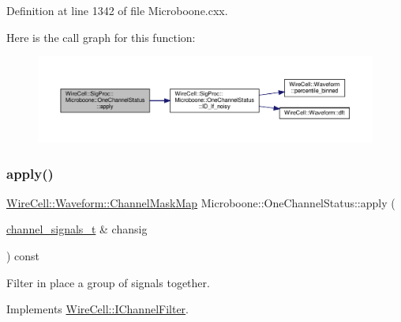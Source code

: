 Definition at line 1342 of file Microboone.\+cxx.

Here is the call graph for this function\+:
\nopagebreak
\begin{figure}[H]
\begin{center}
\leavevmode
\includegraphics[width=350pt]{class_wire_cell_1_1_sig_proc_1_1_microboone_1_1_one_channel_status_af75669068bb7e6b9e618c887025c9fa3_cgraph}
\end{center}
\end{figure}
\mbox{\label{class_wire_cell_1_1_sig_proc_1_1_microboone_1_1_one_channel_status_a4719e79f3e553512387a4de632451818}} 
\subsubsection{\texorpdfstring{apply()}{apply()}\hspace{0.1cm}{\footnotesize\ttfamily [2/2]}}
{\footnotesize\ttfamily \hyperlink{namespace_wire_cell_1_1_waveform_a18b9ae61c858e340252ba3ac83ac3bc0}{Wire\+Cell\+::\+Waveform\+::\+Channel\+Mask\+Map} Microboone\+::\+One\+Channel\+Status\+::apply (\begin{DoxyParamCaption}\item[{\hyperlink{class_wire_cell_1_1_i_channel_filter_a44de35ce47701d84cd45393c6bcd5e2f}{channel\+\_\+signals\+\_\+t} \&}]{chansig }\end{DoxyParamCaption}) const\hspace{0.3cm}{\ttfamily [virtual]}}

Filter in place a group of signals together. 

Implements \hyperlink{class_wire_cell_1_1_i_channel_filter_a47554d77b1dca5596dc61e2221e0a137}{Wire\+Cell\+::\+I\+Channel\+Filter}.



